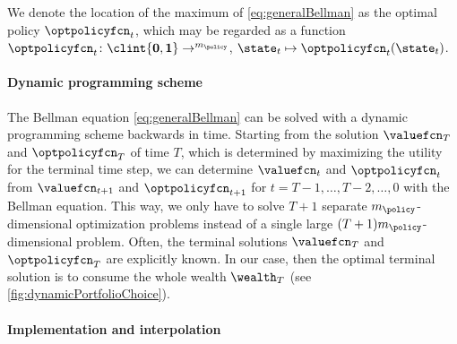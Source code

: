 We denote the location of the maximum of \eqref{eq:generalBellman}
as the optimal policy $\optpolicyfcn_t$,
which may be regarded as a function
$\optpolicyfcn_t\colon \clint{\*0, \*1} \to \real^{m_{\policy}}$,
$\state_t \mapsto \optpolicyfcn_t(\state_t)$.

\paragraph{Dynamic programming scheme}

The Bellman equation \eqref{eq:generalBellman} can be solved
with a dynamic programming scheme backwards in time.
Starting from the solution $\valuefcn_T$ and $\optpolicyfcn_T$
of time $T$, which is determined by maximizing the utility
for the terminal time step,
we can determine $\valuefcn_t$ and $\optpolicyfcn_t$
from $\valuefcn_{t+1}$ and $\optpolicyfcn_{t+1}$
for $t = T - 1, \dotsc, T - 2, \dotsc, 0$ with the Bellman equation.
This way, we only have to solve $T+1$ separate $m_{\policy}$-dimensional
optimization problems instead of a single large
$(T+1) m_{\policy}$-dimensional problem.
Often, the terminal solutions $\valuefcn_T$ and $\optpolicyfcn_T$
are explicitly known.
In our case, then the optimal terminal solution is
to consume the whole wealth $\wealth_T$
(see \cref{fig:dynamicPortfolioChoice}).

\paragraph{Implementation and interpolation}

